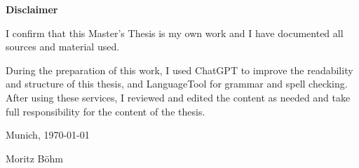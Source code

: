 \cleardoublepage{}

\thispagestyle{empty}

\vspace*{20mm}
\noindent

\makeatletter

\begin{center}
    {\textbf{Disclaimer}}
\end{center}

\begin{flushleft}
    {I confirm that this Master's Thesis is my own work and I have documented all sources and material used.

    During the preparation of this work, I used ChatGPT to improve the readability and structure of this thesis, and LanguageTool for grammar and spell checking. After using these services, I reviewed and edited the content as needed and take full responsibility for the content of the thesis.}


    

    \makeatother

    \vspace{15mm}
    \noindent

    Munich, \today{}

    Moritz Böhm
\end{flushleft}

\cleardoublepage{}
